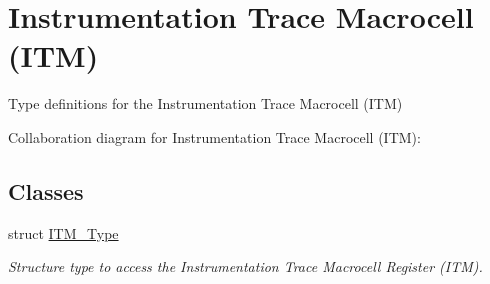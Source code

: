 \hypertarget{group__CMSIS__ITM}{}\section{Instrumentation Trace Macrocell (I\+TM)}
\label{group__CMSIS__ITM}


Type definitions for the Instrumentation Trace Macrocell (I\+TM)  


Collaboration diagram for Instrumentation Trace Macrocell (I\+TM)\+:
\subsection*{Classes}
\begin{DoxyCompactItemize}
\item 
struct \hyperlink{structITM__Type}{I\+T\+M\+\_\+\+Type}
\begin{DoxyCompactList}\small\item\em Structure type to access the Instrumentation Trace Macrocell Register (I\+TM). \end{DoxyCompactList}\end{DoxyCompactItemize}
